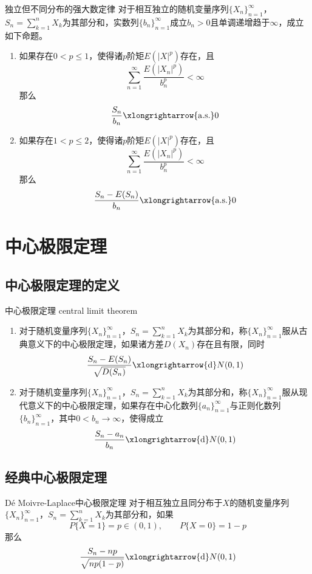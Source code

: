 \documentclass[lang = cn, scheme = chinese, thmcnt = section]{elegantbook}
\newcommand{\toas}{\xlongrightarrow{\mathrm{a.s.}}}
\newcommand{\tod}{\xlongrightarrow{\mathrm{d}}}
\newcommand{\dis}{\displaystyle}
\begin{document}
\begin{theorem}{独立但不同分布的强大数定律}
	对于相互独立的随机变量序列$\{ X_n \}_{n=1}^{\infty}$，$\dis S_n=\sum_{k=1}^{n}X_k$为其部分和，实数列$\{ b_n \}_{n=1}^{\infty}$成立$b_n>0$且单调递增趋于$\infty$，成立如下命题。
	\begin{enumerate}
		\item 如果存在$0<p\le 1$，使得诸$p$阶矩$E(|X|^p)$存在，且%
		$$
		\sum_{n=1}^{\infty}\frac{E(|X_n|^p)}{b_n^p}<\infty
		$$
		那么%
		$$
		\frac{S_n}{b_n}\toas 0
		$$
		\item 如果存在$1<p\le 2$，使得诸$p$阶矩$E(|X|^p)$存在，且%
		$$
		\sum_{n=1}^{\infty}\frac{E(|X_n|^p)}{b_n^p}<\infty
		$$
		那么%
		$$
		\frac{S_n-E(S_n)}{b_n}\toas 0
		$$
	\end{enumerate}
\end{theorem}

\section{中心极限定理}

\subsection{中心极限定理的定义}

\begin{definition}{中心极限定理 central limit theorem}
	\begin{enumerate}
		\item 对于随机变量序列$\{ X_n \}_{n=1}^{\infty}$，$\dis S_n=\sum_{k=1}^{n}X_k$为其部分和，称$\{ X_n \}_{n=1}^{\infty}$服从古典意义下的中心极限定理，如果诸方差$D(X_n)$存在且有限，同时%
		$$
		\frac{S_n-E(S_n)}{\sqrt{D(S_n)}}\tod N(0,1)
		$$
		\item 对于随机变量序列$\{ X_n \}_{n=1}^{\infty}$，$\dis S_n=\sum_{k=1}^{n}X_k$为其部分和，称$\{ X_n \}_{n=1}^{\infty}$服从现代意义下的中心极限定理，如果存在中心化数列$\{ a_n \}_{n=1}^{\infty}$与正则化数列$\{ b_n \}_{n=1}^{\infty}$，其中$0<b_n\to \infty$，使得成立
		$$
		\frac{S_n-a_n}{b_n}\tod N(0,1)
		$$
	\end{enumerate}
\end{definition}

\subsection{经典中心极限定理}

\begin{theorem}{Dé Moivre-Laplace中心极限定理}
	对于相互独立且同分布于$X$的随机变量序列$\{ X_n \}_{n=1}^{\infty}$，$\dis S_n=\sum_{k=1}^{n}X_k$为其部分和，如果%
	$$
	P\{ X=1 \}=p\in(0,1),\qquad
	P\{ X=0 \}=1-p
	$$
	那么%
	$$
	\frac{S_n-np}{\sqrt{np(1-p)}}\tod N(0,1)
	$$
\end{theorem}
\end{document}
